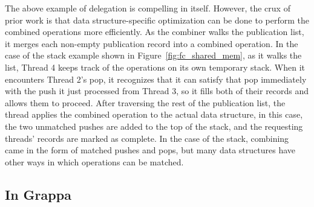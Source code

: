 The above example of delegation is compelling in itself. However, the crux of prior work is that data structure-specific optimization can be done to perform the combined operations more efficiently.
As the combiner walks the publication list, it merges each non-empty publication record into a combined operation. In the case of the stack example shown in Figure~\ref{fig:fc_shared_mem}, as it walks the list, Thread 4 keeps track of the operations on its own temporary stack. When it encounters Thread 2's pop, it recognizes that it can satisfy that pop immediately with the push it just processed from Thread 3, so it fills both of their records and allows them to proceed. After traversing the rest of the publication list, the thread applies the combined operation to the actual data structure, in this case, the two unmatched pushes are added to the top of the stack, and the requesting threads' records are marked as complete.
In the case of the stack, combining came in the form of matched pushes and pops, but many data structures have other ways in which operations can be matched.

\subsection{In Grappa}

